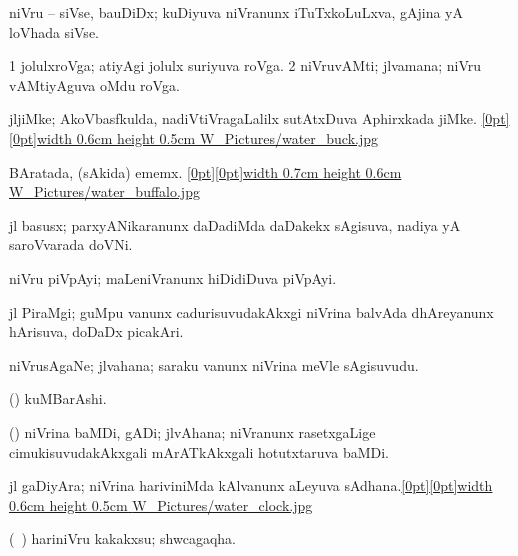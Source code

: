 {\bentry
{} 
\gl{\nA}
\expl{}
\bmng
niVru -- siVse, bauDiDx; kuDiyuva niVranunx iTuTxkoLuLxva, gAjina yA loVhada siVse. 
\emng
\eentry

\bentry
{} 
\gl{\nA}
\expl{}
\bmng
\bnum
\num{1} jolulxroVga; atiyAgi jolulx suriyuva roVga. 
\num{2} niVruvAMti; jlvamana; niVru vAMtiyAguva oMdu roVga. 
\enum
\emng
\eentry

\bentry
{} 
\gl{\nA}
\bmng
jljiMke; AkoVbasfkulda, nadiVtiVragaLalilx sutAtxDuva Aphirxkada jiMke. \quad \hyperlink{water_buckfigure}{\raisebox{-0.20cm}[0pt][0pt]{\pdfimage width 0.6cm height 0.5cm {W_Pictures/water_buck.jpg}}} 
\emng
\eentry

\bentry
{} 
\gl{\nA}
\bmng
BAratada, (sAkida) ememx. \quad \hyperlink{water_buffalofigure}{\raisebox{-0.20cm}[0pt][0pt]{\pdfimage width 0.7cm height 0.6cm {W_Pictures/water_buffalo.jpg}}} 
\emng
\eentry

\bentry
{} 
\gl{\nA}
\expl{}
\bmng
jl basusx; parxyANikaranunx daDadiMda daDakekx sAgisuva, nadiya yA saroVvarada doVNi. 
\emng
\eentry

\bentry
{} 
\gl{\nA}
\expl{}
\bmng
niVru piVpAyi; maLeniVranunx hiDidiDuva piVpAyi. 
\emng
\eentry

\bentry
{} 
\gl{\nA}
\expl{}
\bmng
jl PiraMgi; guMpu \mo vanunx cadurisuvudakAkxgi niVrina balvAda dhAreyanunx hArisuva, doDaDx picakAri. 
\emng
\eentry

\bentry
{} 
\gl{\nA}
\expl{}
\bmng
niVrusAgaNe; jlvahana; saraku \mo vanunx niVrina meVle sAgisuvudu. 
\emng
\eentry

\bentry
{} 
\gl{\nA}
\expl{}
\bmng
(\Kavi) kuMBarAshi. 
\emng
\eentry

\bentry
{} 
\gl{\nA}
\expl{}
\bmng
(\kanmu) niVrina baMDi, gADi; jlvAhana; niVranunx rasetxgaLige cimukisuvudakAkxgali mArATkAkxgali hotutxtaruva baMDi. 
\emng
\eentry

\bentry
{} 
\gl{\nA}
\bmng
jl gaDiyAra; niVrina hariviniMda kAlvanunx aLeyuva sAdhana.\quad \hyperlink{water_clockfigure}{\raisebox{-0.20cm}[0pt][0pt]{\pdfimage width 0.6cm height 0.5cm {W_Pictures/water_clock.jpg}}} 
\emng
\eentry

\bentry
{} 
\gl{\nA}
\expl{}
\bmng
(\saMkiSx\ ) hariniVru kakakxsu; shwcagaqha. 
\emng
\eentry

}
